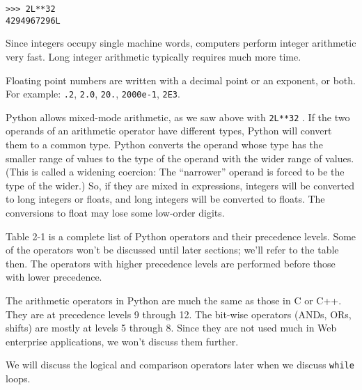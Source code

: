 \begin{verbatim}
>>> 2L**32
4294967296L
\end{verbatim}


Since integers occupy single
machine words, computers perform integer arithmetic very fast. Long
integer arithmetic typically requires much more time.

Floating point numbers are written
with a decimal point or an exponent, or both. For example: \texttt{.2},
\texttt{2.0}, \texttt{20.}, \texttt{2000e-1}, \texttt{2E3}.

Python allows mixed-mode
arithmetic, as we saw above with \texttt{2L**32} . If the two operands of
an arithmetic operator have different types, Python will convert them to
a common type. Python converts the operand whose type has the smaller
range of values to the type of the operand with the wider range of
values. (This is called a widening coercion: The ``narrower'' operand is
forced to be the type of the wider.) So, if they are mixed in
expressions, integers will be converted to long integers or floats, and
long integers will be converted to floats. The conversions to float may
lose some low-order digits.


Table 2-1 is a complete list of
Python operators and their precedence levels. Some of the operators
won't be discussed until later sections; we'll refer to the table then.
The operators with higher precedence levels are performed before those
with lower precedence.

The arithmetic operators in Python
are much the same as those in C or C++. They are at precedence levels 9
through 12. The bit-wise operators (ANDs, ORs, shifts) are mostly at
levels 5 through 8. Since they are not used much in Web enterprise
applications, we won't discuss them further.

We will discuss the logical and
comparison operators later when we discuss \texttt{while} loops.

